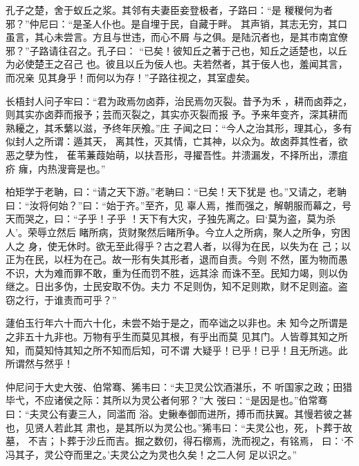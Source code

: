 \documentclass[a4paper,12pt,UTF8,twoside]{ctexbook}
\begin{document}
孔子之楚，舍于蚁丘之浆。其邻有夫妻臣妾登极者，子路曰：“是 稯稯何为者邪？”仲尼曰：“是圣人仆也。是自埋于民，自藏于畔。 其声销，其志无穷，其口虽言，其心未尝言。方且与世违，而心不屑 与之俱。是陆沉者也，是其市南宜僚邪？”子路请往召之。孔子曰： “已矣！彼知丘之著于己也，知丘之适楚也，以丘为必使楚王之召己 也。彼且以丘为佞人也。夫若然者，其于佞人也，羞闻其言，而况亲 见其身乎！而何以为存！”子路往视之，其室虚矣。

长梧封人问子牢曰：“君为政焉勿卤莽，治民焉勿灭裂。昔予为禾 ，耕而卤莽之，则其实亦卤莽而报予；芸而灭裂之，其实亦灭裂而报 予。予来年变齐，深其耕而熟耰之，其禾蘩以滋，予终年厌飧。”庄 子闻之曰：“今人之治其形，理其心，多有似封人之所谓：遁其天， 离其性，灭其情，亡其神，以众为。故卤莽其性者，欲恶之孽为性， 萑苇蒹葭始萌，以扶吾形，寻擢吾性。并溃漏发，不择所出，漂疽疥 癕，内热溲膏是也。”

柏矩学于老聃，曰：“请之天下游。”老聃曰：“已矣！天下犹是 也。”又请之，老聃曰：“汝将何始？”曰：“始于齐。”至齐，见 辜人焉，推而强之，解朝服而幕之，号天而哭之，曰：“子乎！子乎 ！天下有大灾，子独先离之。曰‘莫为盗，莫为杀人’。荣辱立然后 睹所病，货财聚然后睹所争。今立人之所病，聚人之所争，穷困人之 身，使无休时。欲无至此得乎？古之君人者，以得为在民，以失为在 己；以正为在民，以枉为在己。故一形有失其形者，退而自责。今则 不然，匿为物而愚不识，大为难而罪不敢，重为任而罚不胜，远其涂 而诛不至。民知力竭，则以伪继之。日出多伪，士民安取不伪。夫力 不足则伪，知不足则欺，财不足则盗。盗窃之行，于谁责而可乎？”

蘧伯玉行年六十而六十化，未尝不始于是之，而卒诎之以非也。未 知今之所谓是之非五十九非也。万物有乎生而莫见其根，有乎出而莫 见其门。人皆尊其知之所知，而莫知恃其知之所不知而后知，可不谓 大疑乎！已乎！已乎！且无所逃。此所谓然与然乎！

仲尼问于大史大弢、伯常骞、狶韦曰：“夫卫灵公饮酒湛乐，不 听国家之政；田猎毕弋，不应诸侯之际：其所以为灵公者何邪？”大 弢曰：“是因是也。”伯常骞曰：“夫灵公有妻三人，同滥而 浴。史鳅奉御而进所，搏币而扶翼。其慢若彼之甚也，见贤人若此其 肃也，是其所以为灵公也。”狶韦曰：“夫灵公也，死，卜葬于故墓， 不吉；卜葬于沙丘而吉。掘之数仞，得石槨焉，洗而视之，有铭焉， 曰：‘不冯其子，灵公夺而里之。’夫灵公之为灵也久矣！之二人何 足以识之。”
\end{document}
